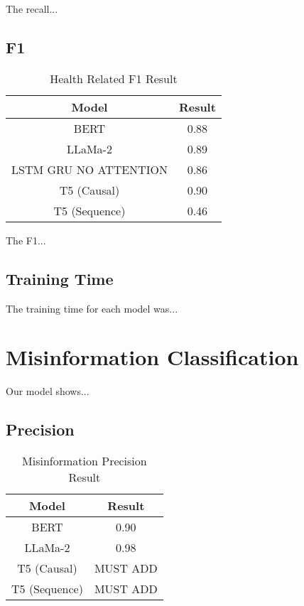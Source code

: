 The recall...


\subsection{F1}
\begin{table}[ht!]
	\centering
	\caption{Health Related F1 Result}
	\begin{tabular}{||c | c||} 
		\hline
		\textbf{Model} & \textbf{Result} \\ [0.5ex] 
		\hline
		BERT & 0.88  \\
		\hline
		LLaMa-2 & 0.89 \\ 
		\hline
		LSTM GRU NO ATTENTION & 0.86  \\
		\hline
		T5 (Causal) & 0.90 \\
		\hline
		T5 (Sequence) & 0.46 \\
		\hline
	\end{tabular}
	\label{table:HealthF1}
\end{table}

The F1...

\subsection{Training Time}

The training time for each model was...


\section{Misinformation Classification}
Our model shows...

\subsection{Precision}
\begin{table}[ht!]
	\centering
	\caption{Misinformation Precision Result}
	\begin{tabular}{||c | c||} 
		\hline
		\textbf{Model} & \textbf{Result} \\ [0.5ex] 
		\hline
		BERT & 0.90  \\
		\hline
		LLaMa-2 & 0.98 \\ 
		\hline
		T5 (Causal) & MUST ADD \\
		\hline
		T5 (Sequence) & MUST ADD \\
		\hline
	\end{tabular}
	\label{table:MisinformationPrecision}
\end{table}

